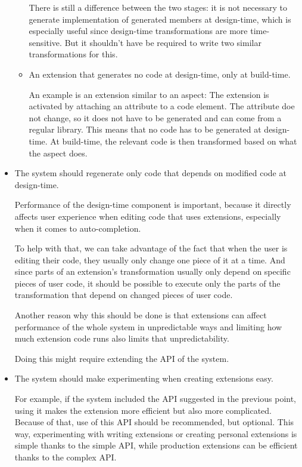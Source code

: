 \begin{itemize}
\begin{itemize}
There is still a difference between the two stages: it is not necessary to generate implementation of generated members at design-time, which is especially useful since design-time transformations are more time-sensitive. But it shouldn't have be required to write two similar transformations for this.

\item An extension that generates no code at design-time, only at build-time.

An example is an extension similar to an aspect: The extension is activated by attaching an attribute to a code element. The attribute doe not change, so it does not have to be generated and can come from a regular library. This means that no code has to be generated at design-time. At build-time, the relevant code is then transformed based on what the aspect does.

\end{itemize}

\item The system should regenerate only code that depends on modified code at design-time.

Performance of the design-time component is important, because it directly affects user experience when editing code that uses extensions, especially when it comes to auto-completion.

To help with that, we can take advantage of the fact that when the user is editing their code, they usually only change one piece of it at a time. And since parts of an extension's transformation usually only depend on specific pieces of user code, it should be possible to execute only the parts of the transformation that depend on changed pieces of user code.

Another reason why this should be done is that extensions can affect performance of the whole system in unpredictable ways and limiting how much extension code runs also limits that unpredictability.

Doing this might require extending the \ac{API} of the system.

\item The system should make experimenting when creating extensions easy.

For example, if the system included the \ac{API} suggested in the previous point, using it makes the extension more efficient but also more complicated. Because of that, use of this \ac{API} should be recommended, but optional. This way, experimenting with writing extensions or creating personal extensions is simple thanks to the simple \ac{API}, while production extensions can be efficient thanks to the complex \ac{API}.


\end{itemize}
